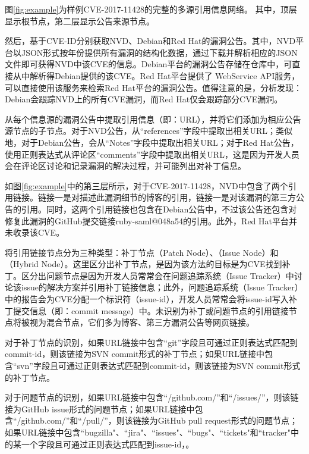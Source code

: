 \begin{exmp}
图\ref{fig:example}为样例CVE-2017-11428的完整的多源引用信息网络。 其中，顶层显示根节点，第二层显示公告来源节点。
\end{exmp}

然后，\tool 基于CVE-ID分别获取NVD、Debian和Red Hat的漏洞公告。其中，NVD平台以JSON形式按年份提供所有漏洞的结构化数据\cite{nvd-feed}，\tool 通过下载并解析相应的JSON文件即可获得NVD中该CVE的信息。Debian平台的漏洞公告存储在仓库\cite{debian-repo}中，\tool 可直接从中解析得Debian提供的该CVE。Red Hat平台提供了 WebService API\cite{redhat-api}服务，\tool 可以直接使用该服务来检索Red Hat平台的漏洞公告。值得注意的是，分析发现：Debian会跟踪NVD上的所有CVE漏洞，而Red Hat仅会跟踪部分CVE漏洞。

\tool 从每个信息源的漏洞公告中提取引用信息（即：URL），并将它们添加为相应公告源节点的子节点。对于NVD公告，\tool 从“references”字段中提取出相关URL；类似地，对于Debian公告，\tool 会从“Notes”字段中提取出相关URL；对于Red Hat公告，\tool 使用正则表达式从评论区“comments”字段中提取出相关URL，这是因为开发人员会在评论区讨论和记录漏洞的解决过程，并可能列出对补丁信息。

\begin{exmp}
如图\ref{fig:example}中的第三层所示，对于CVE-2017-11428，NVD中包含了两个引用链接。链接一是对描述此漏洞细节的博客的引用，链接一是对该漏洞的第三方公告的引用。同时，这两个引用链接也包含在Debian公告中，不过该公告还包含对修复此漏洞的GitHub提交链接ruby-saml@048a54\cite{ruby-saml-1}的引用。此外，Red Hat平台并未收录该CVE。
\end{exmp}

\tool 将引用链接节点分为三种类型：补丁节点（Patch Node）、（Issue Node）和（Hybrid Node）。这里区分出补丁节点，是因为该方法的目标是为CVE找到补丁。区分出问题节点是因为开发人员常常会在问题追踪系统（Issue Tracker）中讨论该issue的解决方案并引用补丁链接信息；此外，问题追踪系统（Issue Tracker）中的报告会为CVE分配一个标识符（issue-id），开发人员常常会将issue-id写入补丁提交信息（即：commit message）中。未识别为补丁或问题节点的引用链接节点将被视为混合节点，它们多为博客、第三方漏洞公告等网页链接。

对于补丁节点的识别，如果URL链接中包含“git”字段且可通过正则表达式匹配到commit-id，则该链接为SVN commit形式的补丁节点；如果URL链接中包含“svn”字段且可通过正则表达式匹配到commit-id，则该链接为SVN commit形式的补丁节点。

对于问题节点的识别，如果URL链接中包含``/github.com/''和``/issues/''，则该链接为GitHub issue形式的问题节点；如果URL链接中包含``/github.com/''和``/pull/''，则该链接为GitHub pull request形式的问题节点；如果URL链接中包含``bugzilla"、``jira"、``issues"、``bugs"、``tickets"和``tracker"中的某一个字段且可通过正则表达式匹配到issue-id，。

